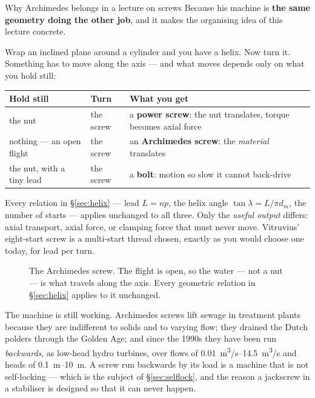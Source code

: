 \documentclass[11pt,a4paper]{article}
\begin{document}
\begin{keybox}{Why Archimedes belongs in a lecture on screws}
Because his machine is \textbf{the same geometry doing the other job}, and it makes the organising
idea of this lecture concrete.

\medskip
Wrap an inclined plane around a cylinder and you have a helix. Now turn it. Something has to move
along the axis --- and what moves depends only on what you hold still:

\begin{center}\footnotesize
\begin{tabular}{@{}p{3.6cm}p{1.9cm}p{8.0cm}@{}}
\toprule
Hold still & Turn & What you get\\
\midrule
the nut & the screw & a \textbf{power screw}: the nut translates, torque becomes axial force\\[2pt]
nothing --- an open flight & the screw & an \textbf{Archimedes screw}: the \emph{material} translates\\[2pt]
the nut, with a tiny lead & the screw & a \textbf{bolt}: motion so slow it cannot back-drive\\
\bottomrule
\end{tabular}
\end{center}

\medskip
Every relation in \S\ref{sec:helix} --- lead $L=np$, the helix angle $\tan\lambda = L/\pi d_m$, the
number of starts --- applies unchanged to all three. Only the \emph{useful output} differs: axial
transport, axial force, or clamping force that must never move. Vitruvius' eight-start screw is a
multi-start thread chosen, exactly as you would choose one today, for lead per turn.
\end{keybox}

\begin{figure}[H]\centering
\resizebox{0.92\textwidth}{!}{}
\caption{The Archimedes screw. The flight is open, so the water --- not a nut --- is what travels
along the axis. Every geometric relation in \S\ref{sec:helix} applies to it unchanged.}
\label{fig:archimedes}
\end{figure}

\medskip
The machine is still working. Archimedes screws lift sewage in treatment plants because they are
indifferent to solids and to varying flow; they drained the Dutch polders through the Golden Age;
and since the 1990s they have been run \emph{backwards}, as low-head hydro turbines, over flows of
\SIrange{0.01}{14.5}{m^3/s} and heads of \SIrange{0.1}{10}{m}. A screw run backwards by its load is
a machine that is not self-locking --- which is the subject of \S\ref{sec:selflock}, and the reason
a jackscrew in a stabiliser is designed so that it can never happen.
\end{document}
